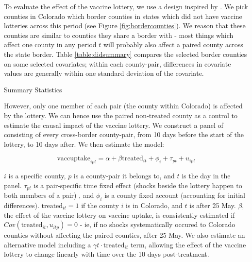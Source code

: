 \documentclass[12pt]{article}
\begin{document}
\begin{spacing}{1.5}
		To evaluate the effect of the vaccine lottery, we use a design inspired by \citet{dube_minimum_2010}. We pick counties in Colorado which border counties in states which did not have vaccine lotteries across this period (see Figure \ref{fig:bordercounties}). We reason that these counties are similar to counties they share a border with - most things which affect one county in any period $t$ will probably also affect a paired county across the state border. Table \ref{table:didsummary} compares the selected border counties on some selected covariates; within each county-pair, differences in covariate values are generally within one standard deviation of the covariate.
		
		\begin{table}
			\centering
			\caption{Summary Statistics}
			\centerline{}
			\label{table:didsummary}
		\end{table}
		
		However, only one member of each pair (the county within Colorado) is affected by the lottery. We can hence use the paired non-treated county as a control to estimate the causal impact of the vaccine lottery. We construct a panel of consisting of every cross-border county-pair, from 10 days before the start of the lottery, to 10 days after. We then estimate the model:
		
		\begin{equation} \label{eq:pairdesign}
			\textrm{vaccuptake}_{ipt} = \alpha + \beta \textrm{treated}_{it} + \phi_i + \tau_{pt} + u_{ipt}
		\end{equation}
		
		$i$ is a specific county, $p$ is a county-pair it belongs to, and $t$ is the day in the panel. $\tau_{pt}$ is a pair-specific time fixed effect (shocks beside the lottery happen to both members of a pair) , and $\phi_i$ is a county fixed account (accounting for initial differences). $\textrm{treated}_{it}=1$ if the county $i$ is in Colorado, and $t$ is after 25 May. $\beta$, the effect of the vaccine lottery on vaccine uptake, is consistently estimated if $Cov(\textrm{treated}_{it}, u_{itp})=0$ - ie, if no shocks systematically occured to Colorado counties without affecting the paired counties, after 25 May. We also estimate an alternative model including a $\gamma t\cdot\textrm{treated}_{it}$ term, allowing the effect of the vaccine lottery to change linearly with time over the 10 days post-treatment.
		

\end{spacing}
\end{document}
